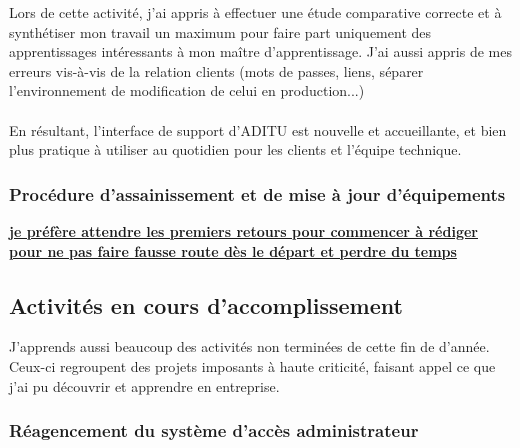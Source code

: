 \begin{sloppypar}
Lors de cette activité, j'ai appris à effectuer une étude comparative correcte et à synthétiser mon travail un maximum pour faire part uniquement des apprentissages intéressants à mon maître d'apprentissage. J'ai aussi appris de mes erreurs vis-à-vis de la relation clients (mots de passes, liens, séparer l'environnement de modification de celui en production...)
\\ \\
En résultant, l'interface de support d'ADITU est nouvelle et accueillante, et bien plus pratique à utiliser au quotidien pour les clients et l'équipe technique.

\subsubsection{Procédure d'assainissement et de mise à jour d'équipements}

\underline{\textbf{je préfère attendre les premiers retours pour commencer à rédiger}}
\underline{\textbf{pour ne pas faire fausse route dès le départ et perdre du temps}}

\subsection{Activités en cours d'accomplissement}

J'apprends aussi beaucoup des activités non terminées de cette fin de d'année. Ceux-ci regroupent des projets imposants à haute criticité, faisant appel ce que j'ai pu découvrir et apprendre en entreprise.

\subsubsection{Réagencement du système d'accès administrateur}


\end{sloppypar}
